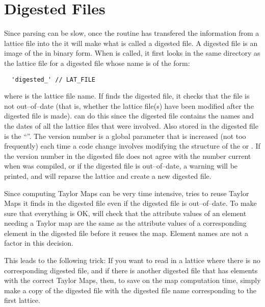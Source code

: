 \section{Digested Files}

Since parsing can be slow, once the  routine has transfered the information from a
lattice file into the  it will make what is called a digested file. A digested file
is an image of the  in binary form. When  is called, it first looks
in the same directory as the lattice file for a digested file whose name is of the form:
\begin{verbatim}
  'digested_' // LAT_FILE 
\end{verbatim}
where  is the lattice file name. If  finds the digested file, it checks
that the file is not out--of--date (that is, whether the lattice file(s) have been modified after
the digested file is made).   can do this since the digested file contains the names
and the dates of all the lattice files that were involved. Also stored in the digested file is the
``\bmad {}''. The \bmad version number is a global parameter that is increased (not
too frequently) each time a code change involves modifying the structure of the  or
. If the \bmad version number in the digested file does not agree with the number
current when  was compiled, or if the digested file is out--of--date, a warning will
be printed, and  will reparse the lattice and create a new digested file.

Since computing Taylor Maps can be very time intensive,  tries to reuse Taylor Maps
it finds in the digested file even if the digested file is out--of--date. To make sure that
everything is OK,  will check that the attribute values of an element needing a
Taylor map are the same as the attribute values of a corresponding element in the digested file
before it reuses the map. Element names are not a factor in this decision.

This leads to the following trick: If you want to read in a lattice where there is no corresponding
digested file, and if there is another digested file that has elements with the correct Taylor Maps,
then, to save on the map computation time, simply make a copy of the digested file with the digested
file name corresponding to the first lattice.

